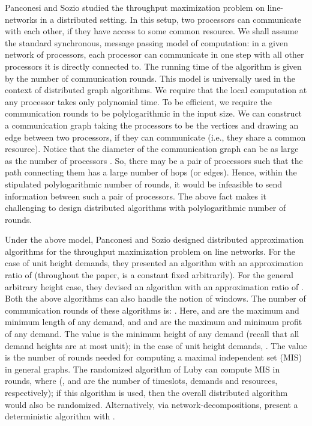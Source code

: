\documentclass[11pt]{article}
\begin{document}
Panconesi and Sozio \cite{Pancc,Pancj} studied the throughput maximization problem on line-networks 
in a distributed setting. In this setup, two processors can communicate with each other, 
if they have access to some common resource.
We shall assume the standard synchronous, message passing model of computation:
in a given network of processors, each processor can communicate in one step with all
other processors it is directly connected to. The running time of the algorithm is given
by the number of communication rounds. This model is universally used in the context
of distributed graph algorithms. We require that the local computation at any processor
takes only polynomial time. To be efficient, we require the communication rounds
to be polylogarithmic in the input size. 
We can construct a communication graph taking the processors to be the vertices
and drawing an edge between two processors, if they can communicate (i.e., they share a common resource).
Notice that the diameter of the communication graph can be as large
as the number of processors . 
So, there may be a pair of processors such that the path connecting them has a large number of hops (or edges).
Hence, within the stipulated polylogarithmic number of rounds, it would be infeasible to
send information between such a pair of processors.
The above fact makes it challenging to design distributed algorithms with polylogarithmic number of rounds.

Under the above model, Panconesi and Sozio \cite{Pancj} designed distributed approximation
algorithms for the throughput maximization problem on line networks.
For the case of unit height demands, they presented an algorithm with an approximation ratio of 
(throughout the paper,  is a constant fixed arbitrarily).
For the general arbitrary height case, they devised an algorithm with an approximation ratio of .
Both the above algorithms can also handle the notion of windows.
The number of communication rounds of these algorithms is:
.
Here,  and  are the maximum and minimum length of any demand,
and  and  are the maximum and minimum profit of any demand.
The value  is the minimum height of any demand (recall that all demand heights are at most  unit);
in the case of unit height demands, .
The value  is the number of rounds needed for computing a maximal independent set (MIS) in general graphs.
The randomized algorithm of Luby \cite{Luby} can compute MIS in  rounds,
where  (,  and  are the number of timeslots, demands and resources, respectively);
if this algorithm is used, then the overall distributed algorithm would also be randomized.
Alternatively, via network-decompositions, \cite{PancSrini} present a deterministic algorithm 
with .\\
\end{document}
